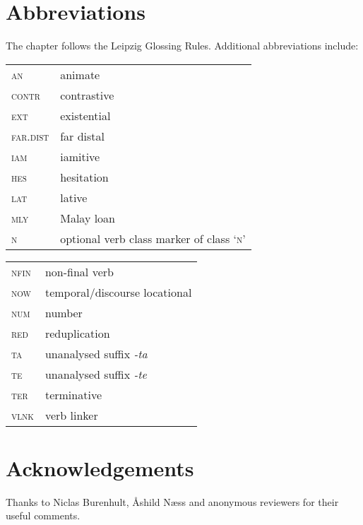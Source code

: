 \documentclass[output=paper,colorlinks,citecolor=brown]{langscibook}
\begin{document}
\section*{Abbreviations}
The chapter follows the Leipzig Glossing Rules. Additional abbreviations include:

\begin{tabularx}{.45\textwidth}{lQ}
	\textsc{an} & animate\\
	\textsc{contr} & contrastive\\
	\textsc{ext} & existential\\
	\textsc{far.dist} & far distal  \\
	\textsc{iam} & iamitive \\
	\textsc{hes} & hesitation\\	
	\textsc{lat} & lative\\
	\textsc{mly} & Malay loan\\
	\textsc{n} & optional verb class marker of class `\textsc{n}'\\
\end{tabularx}
\begin{tabularx}{.45\textwidth}{lQ}
	\textsc{nfin} & non-final verb\\
	\textsc{now} & temporal/discourse locational\\
	\textsc{num} & number\\
	\textsc{red} & reduplication\\	
	\textsc{ta} & unanalysed suffix \textit{-ta} \\	
	\textsc{te} & unanalysed suffix \textit{-te} \\
	\textsc{ter} & terminative\\
	\textsc{vlnk} & verb linker \\
\end{tabularx}

\section*{Acknowledgements}
Thanks to Niclas Burenhult, \r{A}shild N{\ae}ss and anonymous reviewers for their useful comments.

\sloppy\printbibliography[heading=subbibliography,notkeyword=this]
\end{document}
